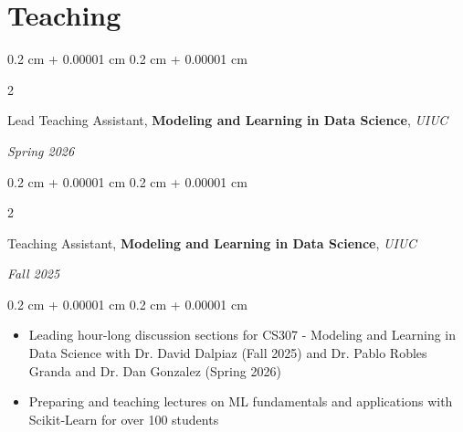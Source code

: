 \documentclass[10pt, letterpaper]{article}
\newenvironment{highlights}{
    \begin{itemize}[
        topsep=0.10 cm,
        parsep=0.10 cm,
        partopsep=0pt,
        itemsep=0pt,
        leftmargin=0.4 cm + 10pt
    ]
}{
    \end{itemize}
} %
\newenvironment{onecolentry}{
    \begin{adjustwidth}{
        0.2 cm + 0.00001 cm
    }{
        0.2 cm + 0.00001 cm
    }
}{
    \end{adjustwidth}
} %
\newenvironment{twocolentry}[2][]{
    \onecolentry
    \def\secondColumn{#2}
    \setcolumnwidth{\fill, 4.5 cm}
    \begin{paracol}{2}
}{
    \switchcolumn \raggedleft \secondColumn
    \end{paracol}
    \endonecolentry
} %
\begin{document}
 
    \section{Teaching}

        
            
            



        \vspace{0.2 cm}
        
        
        \begin{twocolentry}{
            
        \textit{Spring 2026}}
            {Lead Teaching Assistant, \textbf{Modeling and Learning in Data Science}}, \textit{UIUC}
        \end{twocolentry}
        \begin{twocolentry}{
            
        \textit{Fall 2025}}
            {Teaching Assistant, \textbf{Modeling and Learning in Data Science}}, \textit{UIUC}
        \end{twocolentry}

        \vspace{0.10 cm}
        \begin{onecolentry}
            \begin{highlights}
                \item Leading hour-long discussion sections for {CS307 - Modeling and Learning in Data Science} with Dr. David Dalpiaz (Fall 2025) and Dr. Pablo Robles Granda and Dr. Dan Gonzalez (Spring 2026)
                \item Preparing and teaching lectures on ML fundamentals and applications with Scikit-Learn for over 100 students
            \end{highlights}
        \end{onecolentry}
\end{document}
